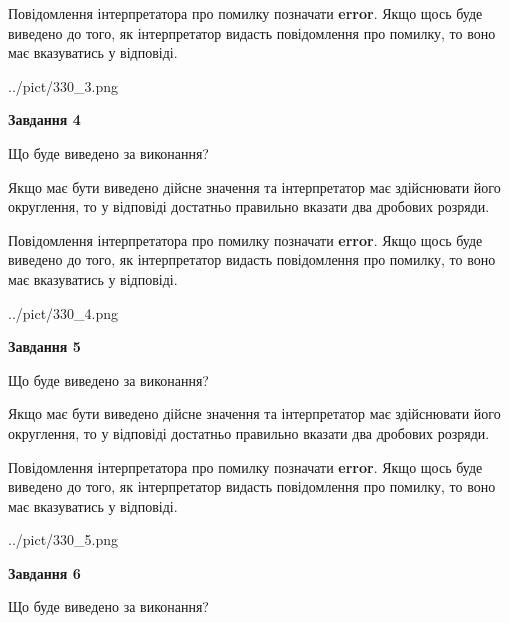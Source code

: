 \documentclass[12pt, ukrainian]{article}
\begin{document}
{\begin {Large}
Повідомлення інтерпретатора про помилку позначати \textbf{error}.
Якщо щось буде виведено до того, як інтерпретатор видасть повідомлення про помилку, 
то воно має вказуватись у відповіді. \par

\begin{center}
	{../pict/330_3.png}
\end{center}
\newpage

{\begin {center}\textbf{Завдання 4}\end {center}}\par
Що буде виведено за виконання? \par

Якщо має бути виведено дійсне значення та інтерпретатор має здійснювати його округлення, 
то у відповіді достатньо правильно вказати два дробових розряди.

Повідомлення інтерпретатора про помилку позначати \textbf{error}.
Якщо щось буде виведено до того, як інтерпретатор видасть повідомлення про помилку, 
то воно має вказуватись у відповіді. \par

\begin{center}
	{../pict/330_4.png}
\end{center}
\newpage

{\begin {center}\textbf{Завдання 5}\end {center}}\par
Що буде виведено за виконання? \par

Якщо має бути виведено дійсне значення та інтерпретатор має здійснювати його округлення, 
то у відповіді достатньо правильно вказати два дробових розряди.

Повідомлення інтерпретатора про помилку позначати \textbf{error}.
Якщо щось буде виведено до того, як інтерпретатор видасть повідомлення про помилку, 
то воно має вказуватись у відповіді. \par

\begin{center}
	{../pict/330_5.png}
\end{center}
\newpage

{\begin {center}\textbf{Завдання 6}\end {center}}\par
Що буде виведено за виконання? \par


\end{Large}}
\end{document}
